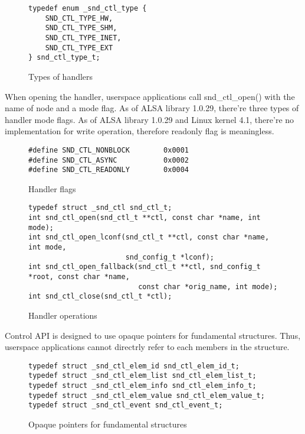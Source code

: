 \documentclass[onecolumn]{article}
\begin{document}
\begin{figure}[htbp]
\small
\begin{verbatim}
typedef enum _snd_ctl_type {
    SND_CTL_TYPE_HW,
    SND_CTL_TYPE_SHM,
    SND_CTL_TYPE_INET,
    SND_CTL_TYPE_EXT
} snd_ctl_type_t;
\end{verbatim}
\caption{{Types of handlers}}
\label{snd-ctl-type-t}
\end{figure}

When opening the handler, userspace applications call snd\_ctl\_open() with the name of node and a mode flag. As of ALSA library 1.0.29, there're three types of handler mode flags. As of ALSA library 1.0.29 and Linux kernel 4.1, there're no implementation for write operation, therefore readonly flag is meaningless.

\begin{figure}[htbp]
\small
\begin{verbatim}
#define SND_CTL_NONBLOCK		0x0001
#define SND_CTL_ASYNC			0x0002
#define SND_CTL_READONLY		0x0004
\end{verbatim}
\caption{{Handler flags}}
\label{handler-flags}
\end{figure}

\begin{figure}[htbp]
\small
\begin{verbatim}
typedef struct _snd_ctl snd_ctl_t;
int snd_ctl_open(snd_ctl_t **ctl, const char *name, int mode);
int snd_ctl_open_lconf(snd_ctl_t **ctl, const char *name, int mode,
                       snd_config_t *lconf);
int snd_ctl_open_fallback(snd_ctl_t **ctl, snd_config_t *root, const char *name,
                          const char *orig_name, int mode);
int snd_ctl_close(snd_ctl_t *ctl);
\end{verbatim}
\caption{{Handler operations}}
\label{handler-operations}
\end{figure}

Control API is designed to use opaque pointers for fundamental structures. Thus, userspace applications cannot directrly refer to each members in the structure.

\begin{figure}[htbp]
\small
\begin{verbatim}
typedef struct _snd_ctl_elem_id snd_ctl_elem_id_t;
typedef struct _snd_ctl_elem_list snd_ctl_elem_list_t;
typedef struct _snd_ctl_elem_info snd_ctl_elem_info_t;
typedef struct _snd_ctl_elem_value snd_ctl_elem_value_t;
typedef struct _snd_ctl_event snd_ctl_event_t;
\end{verbatim}
\caption{{Opaque pointers for fundamental structures}}
\label{opaque-pointers}
\end{figure}
\end{document}
